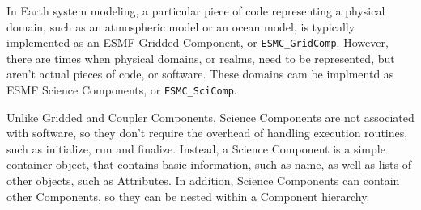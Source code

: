%

\label{sec:SciComp}

In Earth system modeling, a particular piece of code representing a physical 
domain, such as an atmospheric model or an ocean model, is typically 
implemented as an ESMF Gridded Component, or {\tt ESMC\_GridComp}.  
However, there are times when physical domains, or realms, need to be 
represented, but aren't actual pieces of code, or software.  These domains 
cam be implmentd as ESMF Science Components, or {\tt ESMC\_SciComp}.

Unlike Gridded and Coupler Components, Science Components are not associated 
with software, so they don't require the overhead of handling execution 
routines, such as initialize, run and finalize.  Instead, a Science Component 
is a simple container object, that contains basic information, such as name,
as well as lists of other objects, such as Attributes.  In addition, Science
Components can contain other Components, so they can be nested within a
Component hierarchy.
